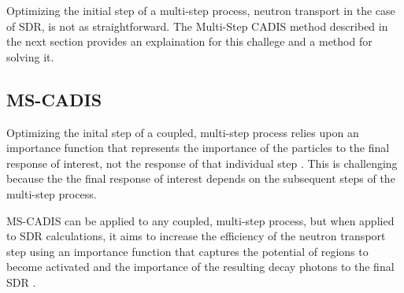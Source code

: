 Optimizing the initial step of a multi-step process, neutron transport in the case of SDR, is not as
straightforward.
The Multi-Step CADIS method described in the next section 
provides an explaination for this challege and a method for solving it.

\subsection{MS-CADIS}\label{sec:mscadis}

Optimizing the inital step of a coupled, multi-step process relies upon
an importance function that represents the importance of the particles to the
final response of interest, not the response of that individual step \cite{mscadis}.  
This is challenging because the the final response of interest depends on the subsequent 
steps of the multi-step process.

MS-CADIS can be applied to any coupled, multi-step process, but when applied to
SDR calculations, it aims to increase the efficiency of the neutron transport step
using an importance function that captures the potential of regions to become 
activated and the importance of the resulting decay photons to the final SDR \cite{mscadis}.

